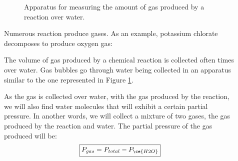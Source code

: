 \documentclass[main.tex]{subfiles}
\begin{document}
\begin{description}
\item[] 
\begin{figure}\begin{center}
\label{fig:{\chapterlabel}8}
\caption{Apparatus for measuring the amount of gas produced by a reaction over water.}
\end{center}\end{figure}


Numerous reaction produce gases. As an example, potassium chlorate decomposes to produce oxygen gas:
\begin{center}\end{center}
The volume of gas produced by a chemical reaction is collected often times over water. Gas bubbles go through water being collected in an apparatus similar to the one represented in Figure \ref{fig:{\chapterlabel}8}. 

As the gas is collected over water, with the gas produced by the reaction, we will also find water molecules that will exhibit a certain partial pressure. In another words, we will collect a mixture of two gases, the gas produced by the reaction and water. The partial pressure of the gas produced will be:
\begin{equation*}
\boxed{  P_{gas}=P_{total}- P_{\ce{H2O}}  }  
 \end{equation*}





\end{description}
\end{document}

